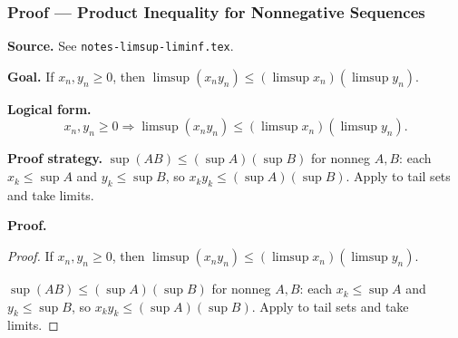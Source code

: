 
\clearpage
{}
\hypertarget{proof-RA-ABB-T-limsup-product-ineq}{}

\subsubsection[Product Inequality for Nonnegative Sequences]{Proof --- Product Inequality for Nonnegative Sequences}

\bigskip

\noindent
\textbf{Source.} See \texttt{notes-limsup-liminf.tex}.

\vspace{0.75em}

\noindent
\textbf{Goal.} If $x_n, y_n \ge 0$, then $\limsup(x_n y_n) \le (\limsup x_n)(\limsup y_n)$.

\vspace{0.75em}

\noindent
\textbf{Logical form.}
\[
  x_n, y_n \ge 0 \Rightarrow \limsup(x_n y_n) \le (\limsup x_n)(\limsup y_n).
\]

\vspace{0.75em}

\noindent
\textbf{Proof strategy.} $\sup(AB) \le (\sup A)(\sup B)$ for nonneg $A, B$: each $x_k \le \sup A$ and $y_k \le \sup B$, so $x_k y_k \le (\sup A)(\sup B)$. Apply to tail sets and take limits.

\vspace{0.75em}

\noindent
\textbf{Proof.}
\begin{proof}
\Claim If $x_n, y_n \ge 0$, then $\limsup(x_n y_n) \le (\limsup x_n)(\limsup y_n)$.

\Given 

\Goal 

\Strategy $\sup(AB) \le (\sup A)(\sup B)$ for nonneg $A, B$: each $x_k \le \sup A$ and $y_k \le \sup B$, so $x_k y_k \le (\sup A)(\sup B)$. Apply to tail sets and take limits.

\medskip


\end{proof}

